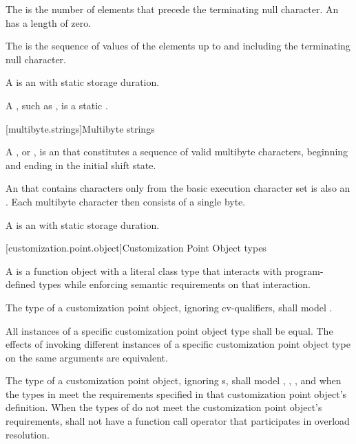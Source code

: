 \pnum
The 
is the number of elements that
precede the terminating null character.
An 
has a length of zero.

\pnum
The 
is the sequence of values of the
elements up to and including the terminating null character.

\pnum
A 
is an \ntbs{} with
static storage duration.
\begin{footnote}
A , such as
,
is a static \ntbs{}.
\end{footnote}

[multibyte.strings]{Multibyte strings}

%
\pnum
A ,
or \ntmbs{},
is an \ntbs{} that constitutes a
sequence of valid multibyte characters, beginning and ending in the initial
shift state.
\begin{footnote}
An \ntbs{} that contains characters only from the
basic execution character set is also an \ntmbs{}.
Each multibyte character then
consists of a single byte.
\end{footnote}

\pnum
A 
is an \ntmbs{} with static storage duration.

[customization.point.object]{Customization Point Object types}

\pnum
A  is a function object
with a literal class type that interacts with program-defined types while
enforcing semantic requirements on that interaction.

\pnum
The type of a customization point object, ignoring cv-qualifiers, shall model
.

\pnum
All instances of a specific customization point object type shall
be equal.
The effects of invoking different instances
of a specific customization point object type on the same arguments
are equivalent.

\pnum
The type  of a customization point object,
ignoring s, shall model
,
,
, and
when the types in  meet the requirements specified in that
customization point object's definition. When the types of  do
not meet the customization point object's requirements,  shall not have
a function call operator that participates in overload resolution.


